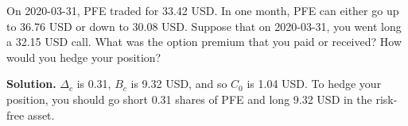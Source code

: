 \noindent On 2020-03-31, PFE traded for 33.42 USD. In one month, PFE can either go up to 36.76 USD or down to 30.08 USD. Suppose that on 2020-03-31, you went long a 32.15 USD call. What was the option premium that you paid or received? How would you hedge your position?

\vspace{9pt}

\noindent\textbf{Solution.} $\Delta_{c}$ is 0.31, $B_{c}$ is 9.32 USD, and so $C_{0}$ is 1.04 USD. To hedge your position, you should go short 0.31 shares of PFE and long 9.32 USD in the risk-free asset.